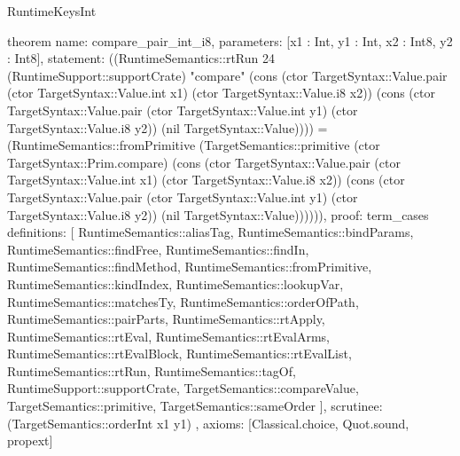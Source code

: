 \begin{lexlean}{RuntimeKeysInt}
\begin{semanticmodule}
theorem{
  name: compare_pair_int_i8,
  parameters: [x1 : Int, y1 : Int, x2 : Int8, y2 : Int8],
  statement: ((RuntimeSemantics::rtRun 24 (RuntimeSupport::supportCrate) "compare" (cons (ctor TargetSyntax::Value.pair (ctor TargetSyntax::Value.int x1) (ctor TargetSyntax::Value.i8 x2)) (cons (ctor TargetSyntax::Value.pair (ctor TargetSyntax::Value.int y1) (ctor TargetSyntax::Value.i8 y2)) (nil TargetSyntax::Value)))) = (RuntimeSemantics::fromPrimitive (TargetSemantics::primitive (ctor TargetSyntax::Prim.compare) (cons (ctor TargetSyntax::Value.pair (ctor TargetSyntax::Value.int x1) (ctor TargetSyntax::Value.i8 x2)) (cons (ctor TargetSyntax::Value.pair (ctor TargetSyntax::Value.int y1) (ctor TargetSyntax::Value.i8 y2)) (nil TargetSyntax::Value)))))),
  proof: term_cases{
    definitions: [
      RuntimeSemantics::aliasTag,
      RuntimeSemantics::bindParams,
      RuntimeSemantics::findFree,
      RuntimeSemantics::findIn,
      RuntimeSemantics::findMethod,
      RuntimeSemantics::fromPrimitive,
      RuntimeSemantics::kindIndex,
      RuntimeSemantics::lookupVar,
      RuntimeSemantics::matchesTy,
      RuntimeSemantics::orderOfPath,
      RuntimeSemantics::pairParts,
      RuntimeSemantics::rtApply,
      RuntimeSemantics::rtEval,
      RuntimeSemantics::rtEvalArms,
      RuntimeSemantics::rtEvalBlock,
      RuntimeSemantics::rtEvalList,
      RuntimeSemantics::rtRun,
      RuntimeSemantics::tagOf,
      RuntimeSupport::supportCrate,
      TargetSemantics::compareValue,
      TargetSemantics::primitive,
      TargetSemantics::sameOrder
    ],
    scrutinee: (TargetSemantics::orderInt x1 y1)
  },
  axioms: [Classical.choice, Quot.sound, propext]
}


\end{semanticmodule}
\end{lexlean}
